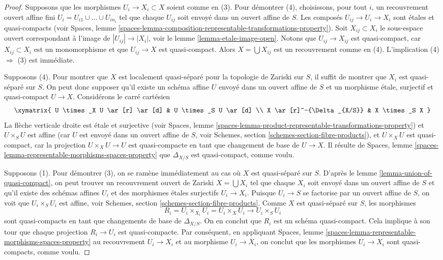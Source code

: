 \begin{proof}
Supposons que les morphismes $U_i \to X_i \subset X$ soient comme en (3). Pour démontrer (4),
choisissons, pour tout $i$, un recouvrement ouvert affine fini $U_i =
U_{i1} \cup \ldots \cup U_{in_i}$ tel que chaque $U_{ij}$ soit envoyé
dans un ouvert affine de $S$. Les composés
$U_{ij} \to U_i \to X_i$ sont étales et quasi-compacts (voir
Spaces, lemme
\ref{spaces-lemma-composition-representable-transformations-property}).
Soit $X_{ij} \subset X_i$ le sous-espace ouvert correspondant à
l'image de $|U_{ij}| \to |X_i|$, voir le
lemme \ref{lemma-etale-image-open}.
Notons que $U_{ij} \to X_{ij}$ est quasi-compact, car $X_{ij} \subset X_i$
est un monomorphisme et que $U_{ij} \to X$ est quasi-compact.
Alors $X = \bigcup X_{ij}$ est un recouvrement comme en (4).
L'implication (4) $\Rightarrow$ (3) est immédiate.

\medskip\noindent
Supposons (4). Pour montrer que $X$ est localement quasi-séparé pour la topologie de Zariski sur $S$,
il suffit de montrer que $X_i$ est quasi-séparé sur $S$.
On peut donc supposer qu'il existe un schéma affine $U$ envoyé dans
un ouvert affine de $S$ et un morphisme étale, surjectif et quasi-compact
$U \to X$. Considérons le carré cartésien
$$
\xymatrix{
U \times_X U \ar[r] \ar[d] & U \times_S U \ar[d] \\
X \ar[r]^-{\Delta_{X/S}} & X \times_S X
}
$$
La flèche verticale droite est étale et surjective (voir
Spaces, lemme
\ref{spaces-lemma-product-representable-transformations-property})
et $U \times_S U$ est affine (car $U$ est envoyé dans un ouvert affine de $S$, voir
Schemes, section \ref{schemes-section-fibre-products}),
et $U \times_X U$ est quasi-compact,
car la projection $U \times_X U \to U$ est quasi-compacte en tant que
changement de base de $U \to X$. Il résulte de
Spaces, lemme \ref{spaces-lemma-representable-morphisms-spaces-property}
que $\Delta_{X/S}$ est quasi-compact, comme voulu.

\medskip\noindent
Supposons (1). Pour démontrer (3), on se ramène immédiatement au cas
où $X$ est quasi-séparé sur $S$. D'après le
lemme \ref{lemma-union-of-quasi-compact},
on peut trouver un recouvrement ouvert de Zariski $X = \bigcup X_i$ tel que chaque
$X_i$ soit envoyé dans un ouvert affine de $S$ et qu'il existe des schémas affines
$U_i$ et des morphismes étales surjectifs $U_i \to X_i$.
Puisque $U_i \to S$ se factorise par un ouvert affine de $S$, on voit que
$U_i \times_S U_i$ est affine, voir
Schemes, section \ref{schemes-section-fibre-products}.
Comme $X$ est quasi-séparé sur $S$, les morphismes
$$
R_i = U_i \times_{X_i} U_i = U_i \times_X U_i
\longrightarrow
U_i \times_S U_i
$$
sont quasi-compacts en tant que changements de base de $\Delta_{X/S}$. On en conclut
que $R_i$ est un schéma quasi-compact. Cela implique à son tour que chaque
projection $R_i \to U_i$ est quasi-compacte. Par conséquent, en appliquant
Spaces, lemme \ref{spaces-lemma-representable-morphisms-spaces-property}
au recouvrement $U_i \to X_i$ et au morphisme $U_i \to X_i$,
on conclut que les morphismes $U_i \to X_i$ sont quasi-compacts, comme voulu.


\end{proof}

